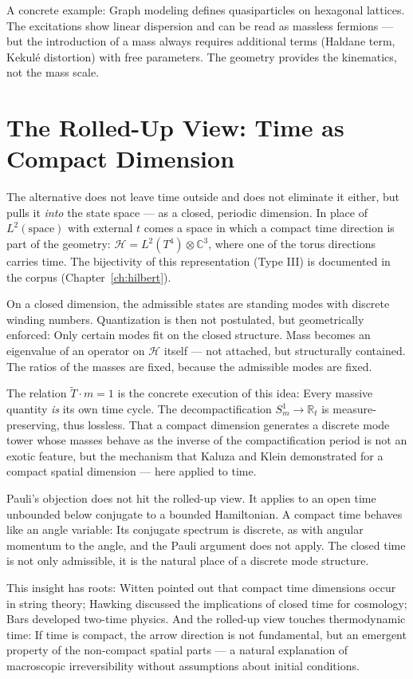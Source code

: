 A concrete example: Graph modeling defines
quasiparticles on hexagonal lattices. The excitations show linear
dispersion and can be read as massless fermions --- but the
introduction of a mass always requires additional terms (Haldane term,
Kekulé distortion) with free parameters. The geometry provides the
kinematics, not the mass scale.

\section{The Rolled-Up View: Time as Compact Dimension}

The alternative does not leave time outside and does not eliminate it either,
but pulls it \emph{into} the state space --- as a closed,
periodic dimension. In place of $L^2(\text{space})$ with external
$t$ comes a space in which a compact time direction is part of the
geometry: $\mathcal{H} = L^2(T^4)\otimes\mathbb{C}^3$, where one of the
torus directions carries time. The bijectivity of this representation
(Type III) is documented in the corpus (Chapter~\ref{ch:hilbert}).

On a closed dimension, the admissible states are standing
modes with discrete winding numbers. Quantization is then not
postulated, but geometrically enforced: Only certain modes fit
on the closed structure. Mass becomes an eigenvalue of an
operator on $\mathcal{H}$ itself --- not attached, but
structurally contained. The ratios of the masses are
fixed, because the admissible modes are fixed.

The relation $\tilde T\cdot m = 1$ is the concrete execution of this
idea: Every massive quantity \emph{is} its own time cycle. The
decompactification $S^1_m\to\mathbb{R}_t$ is measure-preserving, thus
lossless. That a compact dimension generates a discrete mode tower
whose masses behave as the inverse of the compactification period
is not an exotic feature, but the mechanism that Kaluza
and Klein demonstrated for a compact spatial dimension --- here applied to
time.

Pauli's objection does not hit the rolled-up view. It applies to an
open time unbounded below conjugate to a bounded
Hamiltonian. A compact time behaves like an
angle variable: Its conjugate spectrum is discrete, as with
angular momentum to the angle, and the Pauli argument does not apply. The
closed time is not only admissible, it is the natural place
of a discrete mode structure.

This insight has roots: Witten pointed out that compact
time dimensions occur in string theory; Hawking discussed the
implications of closed time for cosmology; Bars developed
two-time physics. And the rolled-up view touches
thermodynamic time: If time is compact, the arrow direction is not
fundamental, but an emergent property of the non-compact
spatial parts --- a natural explanation of macroscopic
irreversibility without assumptions about initial conditions.

